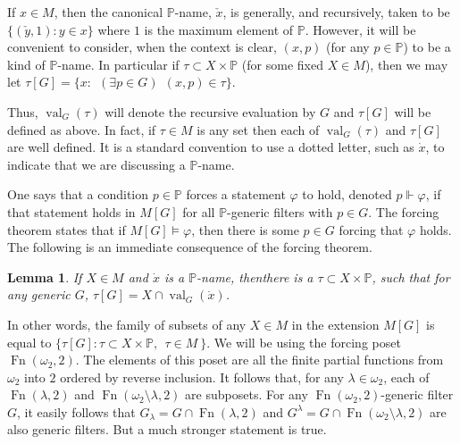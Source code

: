 \documentclass{rmmcart}
\theoremstyle{plain}
\newtheorem{lemma}[theorem]{Lemma}
\theoremstyle{definition}
\theoremstyle{remark}
\theoremstyle{plain}
\theoremstyle{definition}
\theoremstyle{remark}
\def\val{\operatorname{val}}
\begin{document}
            If $x\in M$, then the canonical
            $\mathbb P$-name, $\check x$, is generally, and recursively,
             taken to be
             $\{ (\check y, 1) : y\in x\}$ where $1$ is the maximum element of
             $\mathbb P$.  However, it will be convenient to consider, when the
            context is clear, $(x,p)$ (for any $p\in \mathbb P$)
            to be a kind of $\mathbb P$-name.
            In particular
            if $\tau \subset X\times \mathbb P$ (for some fixed $X\in M$),
            then we may let $\tau[G] = \{ x : ~~(\exists p\in
            G)~~(x,p)\in\tau\}$.


            Thus,  $\val_G(\tau)$ will denote the recursive evaluation by $G$ and
             $\tau[G]$ will be defined as above.
            In fact, if $\tau\in M$ is any set then each of
             $\val_G(\tau)$ and $\tau[G]$ are well defined.
            It is a standard convention to use a dotted letter, such
            as $\dot x$, to indicate that we are discussing a $\mathbb P$-name.

            One says that a condition $p\in \mathbb P$ forces a statement
            $\varphi$
              to hold, denoted $p\Vdash \varphi$,
            if that statement holds in $M[G]$ for all $\mathbb P$-generic filters
            with $p\in G$. The forcing theorem states that if $M[G]\models
            \varphi$,
             then there is some $p\in G$ forcing that $\varphi$ holds.
            The following is an immediate consequence of the forcing theorem.

            \begin{lemma} If $X\in M$ and $\dot x$ is a $\mathbb P$-name,
            then\label{easyname}
             there is a $\tau\subset X\times \mathbb P$, such that
            for any generic $G$, $\tau[G] = X\cap \val_G(\dot x)$.
            \end{lemma}

            In other words, the family of subsets of any $X\in M$ in
            the extension $M[G]$ is equal to
             $\{ \tau[G] : \tau \subset X\times \mathbb P, \ \
            \tau\in M\ \}$.  We will be using
            the forcing poset $\operatorname{Fn}(\omega_2, 2)$.
            The elements of this poset are all the finite partial functions
            from $\omega_2$ into $2$ ordered by reverse inclusion.
            It follows that, for any $\lambda\in \omega_2$,
             each of
             $\operatorname{Fn}(\lambda,2)$ and $\operatorname{Fn}(\omega_2\setminus
             \lambda,2)$ are subposets. For any
             $\operatorname{Fn}(\omega_2,2)$-generic
            filter  $G$, it easily follows that $G_\lambda = G\cap
            \operatorname{Fn}(\lambda,2)$ and
             $G^\lambda = G\cap
            \operatorname{Fn}(\omega_2\setminus
             \lambda,2)$ are also generic filters. But a much stronger statement is
             true.
\end{document}
